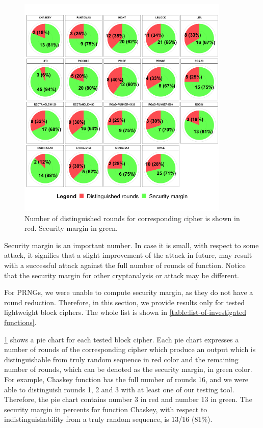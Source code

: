 \documentclass[
    digital,    %
    oneside,    %
    color,
    11pt,
    nocover,
    notable,
    nolof,
    nolot,
    final
]{fithesis3}
\renewcommand\_{\textunderscore\allowbreak}
\begin{document}
\begin{figure}[h]
	\centering
	\includegraphics[width=0.9\textwidth]{./images/pictures/security_margins.png}
	\caption{Number of distinguished rounds for corresponding cipher is shown in red. Security margin in green.}
	\label{fig:security_margins}
\end{figure}

Security margin is an important number. In case it is small, with respect to some attack, it signifies that a slight improvement of the attack in future, may result with a successful attack against the full number of rounds of function. Notice that the security margin for other cryptanalysis or attack may be different. 

For PRNGs, we were unable to compute security margin, as they do not have a round reduction. Therefore, in this section, we provide results only for tested lightweight block ciphers. The whole list is shown in \cref{table:list-of-investigated functions}.

\cref{fig:security_margins} shows a pie chart for each tested block cipher. Each pie chart expresses a number of rounds of the corresponding cipher which produce an output which is distinguishable from truly random sequence in red color and the remaining number of rounds, which can be denoted as the security margin, in green color. For example, Chaskey function has the full number of rounds 16, and we were able to distinguish rounds 1, 2 and 3 with at least one of our testing tool. Therefore, the pie chart contains number 3 in red and number 13 in green. The security margin in percents for function Chaskey, with respect to indistinguishability from a truly random sequence, is 13/16 (81\%).
\end{document}
